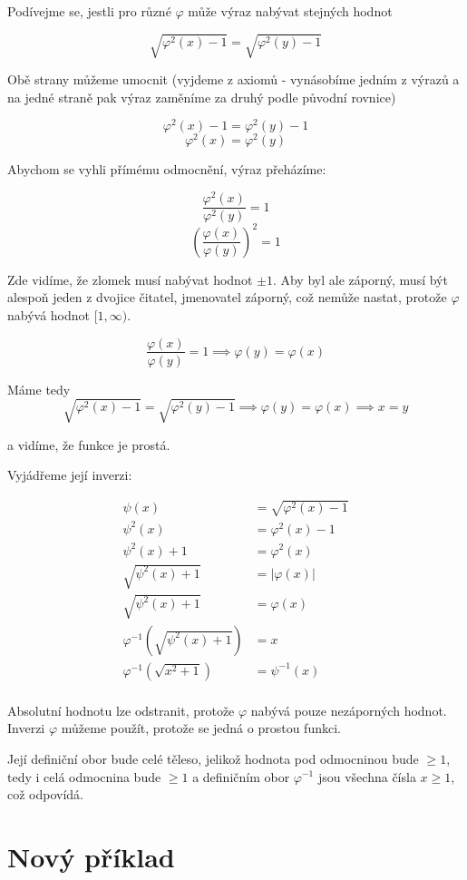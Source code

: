 \documentclass[10pt,a4paper]{article}
\theoremstyle{plain}
\theoremstyle{definition}
\begin{document}
Podívejme se, jestli pro různé $\varphi$ může výraz nabývat stejných hodnot

\[ \sqrt{\varphi^2(x) - 1} = \sqrt{\varphi^2(y) - 1} \]

Obě strany můžeme umocnit (vyjdeme z axiomů - vynásobíme jedním z výrazů a na jedné straně pak výraz zaměníme za druhý podle původní rovnice)

\[{\varphi^2(x) - 1} = {\varphi^2(y) - 1} \]
\[\varphi^2(x) = \varphi^2(y) \]

Abychom se vyhli přímému odmocnění, výraz přeházíme:

\[ \frac{\varphi^2(x)}{\varphi^2(y)} = 1 \]
\[ \left(\frac{\varphi(x)}{\varphi(y)}\right)^2 = 1 \]

Zde vidíme, že zlomek musí nabývat hodnot $\pm 1$. Aby byl ale záporný, musí být alespoň jeden z dvojice čitatel, jmenovatel záporný, což nemůže nastat, protože $\varphi$ nabývá hodnot $[1, \infty)$.

\[\frac{\varphi(x)}{\varphi(y)} = 1 \implies \varphi(y) = \varphi(x)\]

Máme tedy \[\sqrt{\varphi^2(x) - 1} = \sqrt{\varphi^2(y) - 1} \implies \varphi(y) = \varphi(x) \implies x = y \]

a vidíme, že funkce je prostá.

Vyjádřeme její inverzi:

\begin{align*}
\psi(x) &= \sqrt{\varphi^2(x) - 1} \\
\psi^2(x) &= \varphi^2(x) - 1  \\
\psi^2(x) + 1 &= \varphi^2(x)   \\
\sqrt{\psi^2(x) + 1} &= |\varphi(x)|   \\
\sqrt{\psi^2(x) + 1} &= \varphi(x)  \\
\varphi^{-1}\left(\sqrt{\psi^{2}(x) + 1}\right) &= x   \\
\varphi^{-1}\left(\sqrt{x^2 + 1}\right) &= \psi^{-1}(x)   \\
\end{align*}

Absolutní hodnotu lze odstranit, protože $\varphi$ nabývá pouze nezáporných hodnot. Inverzi $\varphi$ můžeme použít, protože se jedná o prostou funkci.


Její definiční obor bude celé těleso, jelikož hodnota pod odmocninou bude $\geq 1$, tedy i celá odmocnina bude $\geq 1$ a definičním obor $\varphi^{-1}$ jsou všechna čísla $x \geq 1$, což odpovídá.

\section{Nový příklad}
\end{document}
